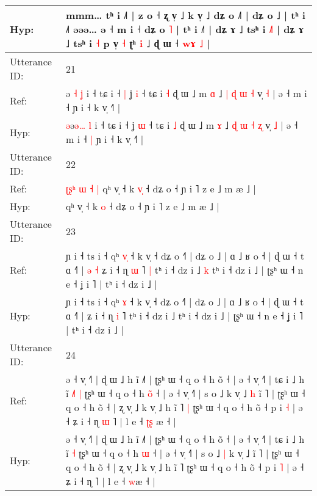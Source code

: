 \documentclass[10pt]{article}
\DeclareRobustCommand{\hl}[1]{{\textcolor{red}{#1}}}
\begin{document}
\begin{longtable}{ll}
 \\
Hyp: & mmm… tʰ i ˩˥ | z o ˧\hl{}\hl{} ʐ v̩ ˩ k v̩ ˩ dʑ o ˩˥ | dʑ o ˩ | tʰ i ˩˥\hl{}\hl{} əəə… ə ˧ m i ˧ dʑ o \hl{˥} | tʰ i ˩˥ | dʑ ɤ ˩ tsʰ i \hl{˩}˥ | dʑ ɤ ˩ tsʰ i \hl{˧} p v̩ \hl{˧} ʈʰ \hl{i} ˩\hl{}\hl{} ɖ ɯ ˧ \hl{w}\hl{ɤ} \hl{˩} |
 \\
\midrule
Utterance ID: & 21 \\
Ref: & \hl{}ə\hl{ }\hl{˧} \hl{ʝ} i ˧ tɕ i ˧\hl{ }\hl{|} ʝ \hl{i} ˧ tɕ i \hl{˧} ɖ ɯ ˩ m \hl{ɑ} ˩ \hl{|} \hl{ɖ} \hl{ɯ} \hl{˧} v̩ \hl{˧} | ə ˧ m i ˧\hl{}\hl{} ɲ i ˧ k v̩ ˧˥ |
 \\
Hyp: & \hl{ə}ə\hl{ə}\hl{…} \hl{l} i ˧ tɕ i ˧\hl{}\hl{} ʝ \hl{ɯ} ˧ tɕ i \hl{˩} ɖ ɯ ˩ m \hl{ɤ} ˩ \hl{ɖ} \hl{ɯ} \hl{˧} \hl{ʐ} v̩ \hl{˩} | ə ˧ m i ˧\hl{ }\hl{|} ɲ i ˧ k v̩ ˧˥ |
 \\
\midrule
Utterance ID: & 22 \\
Ref: & \hl{ʈ}\hl{ʂ}\hl{ʰ}\hl{ }\hl{ɯ}\hl{ }\hl{˧}\hl{ }\hl{|}\hl{ }qʰ v̩ ˧ k \hl{v}\hl{̩} ˧ dʑ o ˧ ɲ i ˥ z e ˩ m æ ˩ |
 \\
Hyp: & \hl{}\hl{}\hl{}\hl{}\hl{}\hl{}\hl{}\hl{}\hl{}\hl{}qʰ v̩ ˧ k \hl{}\hl{o} ˧ dʑ o ˧ ɲ i ˥ z e ˩ m æ ˩ |
 \\
\midrule
Utterance ID: & 23 \\
Ref: & ɲ i ˧ ts i ˧ qʰ \hl{v}\hl{̩} ˧ k v̩ ˧ dʑ o ˧˥ | dʑ o ˩ | ɑ ˩ ʁ o ˧ | ɖ ɯ ˧ t ɑ ˧˥ |\hl{ }\hl{ə}\hl{ }\hl{˧} ʑ i ˧ ɳ \hl{ɯ} ˥\hl{ }\hl{|} tʰ i ˧ dz i ˩\hl{ }\hl{k} tʰ i ˧ dz i ˩ | ʈʂʰ ɯ ˧ n e ˧ ʝ i ˥ | tʰ i ˧ dz i ˩ |
 \\
Hyp: & ɲ i ˧ ts i ˧ qʰ \hl{}\hl{ɤ} ˧ k v̩ ˧ dʑ o ˧˥ | dʑ o ˩ | ɑ ˩ ʁ o ˧ | ɖ ɯ ˧ t ɑ ˧˥ |\hl{}\hl{}\hl{}\hl{} ʑ i ˧ ɳ \hl{i} ˥\hl{}\hl{} tʰ i ˧ dz i ˩\hl{}\hl{} tʰ i ˧ dz i ˩ | ʈʂʰ ɯ ˧ n e ˧ ʝ i ˥ | tʰ i ˧ dz i ˩ |
 \\
\midrule
Utterance ID: & 24 \\
Ref: & ə ˧ v̩ ˧˥ | ɖ ɯ ˩ h ĩ ˩˥ | ʈʂʰ ɯ ˧ q o ˧ h õ ˧ | ə ˧ v̩ ˧˥ | tɕ i ˩ h ĩ\hl{ }\hl{˩}\hl{˥} \hl{|} ʈʂʰ ɯ ˧ q o ˧ h \hl{o}\hl{̃} ˧ | ə ˧ v̩ ˧˥ | s o ˩\hl{}\hl{} k v̩ ˩\hl{ }\hl{h} ĩ ˥ | ʈʂʰ ɯ ˧ q o ˧ h õ ˧ | ʐ v̩ ˩ k v̩ ˩ h ĩ ˥\hl{ }\hl{|} ʈʂʰ ɯ ˧ q o ˧ h õ ˧ p i \hl{˧} | ə ˧ ʑ i ˧ ɳ\hl{ }\hl{ɯ} ˥ | l e ˧ \hl{ʈ}\hl{ʂ}\hl{ }æ ˧ |
 \\
Hyp: & ə ˧ v̩ ˧˥ | ɖ ɯ ˩ h ĩ ˩˥ | ʈʂʰ ɯ ˧ q o ˧ h õ ˧ | ə ˧ v̩ ˧˥ | tɕ i ˩ h ĩ\hl{}\hl{}\hl{} \hl{˧} ʈʂʰ ɯ ˧ q o ˧ h \hl{}\hl{ɯ} ˧ | ə ˧ v̩ ˧˥ | s o ˩\hl{ }\hl{|} k v̩ ˩\hl{}\hl{} ĩ ˥ | ʈʂʰ ɯ ˧ q o ˧ h õ ˧ | ʐ v̩ ˩ k v̩ ˩ h ĩ ˥\hl{}\hl{} ʈʂʰ ɯ ˧ q o ˧ h õ ˧ p i \hl{˥} | ə ˧ ʑ i ˧ ɳ\hl{}\hl{} ˥ | l e ˧ \hl{}\hl{}\hl{w}æ ˧ |
 \\

\end{longtable}
\end{document}
